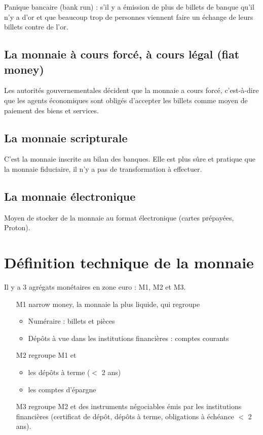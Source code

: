 		Panique bancaire (bank run) : s'il y a émission de plus de billets de banque qu'il n'y a d'or et que beaucoup trop de personnes viennent faire un échange de leurs billets contre de l'or.
		
	\subsection{La monnaie à cours forcé, à cours légal (fiat money)}
		
	Les autorités gouvernementales décident que la monnaie a cours forcé, c'est-à-dire que les agents économiques sont obligés d'accepter les billets comme moyen de paiement des biens et services.
		
	\subsection{La monnaie scripturale}
		
	C'est la monnaie inscrite au bilan des banques. Elle est plus sûre et pratique que la monnaie fiduciaire, il n'y a pas de transformation à effectuer.
		
	\subsection{La monnaie électronique}
		
	Moyen de stocker de la monnaie au format électronique (cartes prépayées, Proton).
		
\section{Définition technique de la monnaie}

	Il y a 3 agrégats monétaires en zone euro : M1, M2 et M3.
	
	\begin{enumerate}
		\item[M1]narrow money, la monnaie la plus liquide, qui regroupe
		
		\begin{itemize}
			\item Numéraire : billets et pièces
			\item Dépôts à vue dans les institutions financières : comptes courants
		\end{itemize}
	
		\item[M2] regroupe M1 et
		
		\begin{itemize}
			\item les dépôts à terme ($<$ 2 ans)
			\item les comptes d'épargne
		\end{itemize}
		
		\item[M3] regroupe M2 et des instruments négociables émis par les institutions financières (certificat de dépôt, dépôts à terme, obligations à échéance $<$ 2 ans).
	\end{enumerate}
	
